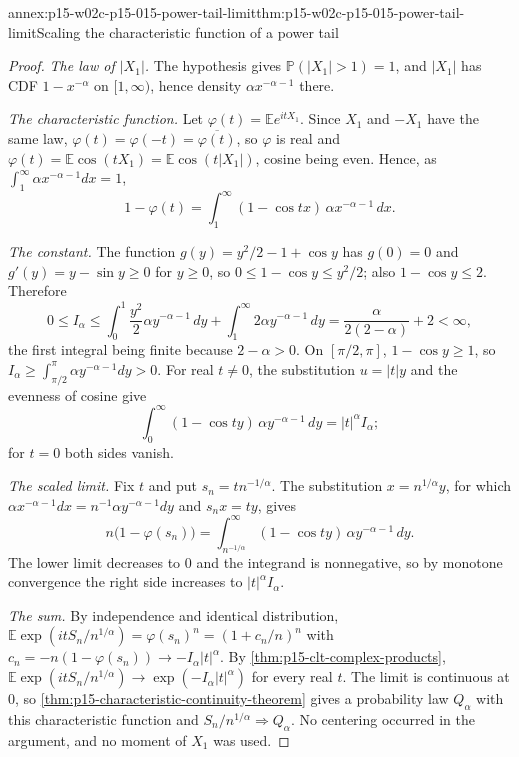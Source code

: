 \begin{annexitem}{annex:p15-w02c-p15-015-power-tail-limit}{thm:p15-w02c-p15-015-power-tail-limit}{Scaling the characteristic function of a power tail}
\begin{proof}
\emph{The law of \(|X_1|\).} The hypothesis gives
\(\mathbb P(|X_1|>1)=1\), and \(|X_1|\) has CDF \(1-x^{-\alpha}\) on
\([1,\infty)\), hence density \(\alpha x^{-\alpha-1}\) there.

\emph{The characteristic function.} Let
\(\varphi(t)=\mathbb Ee^{itX_1}\). Since \(X_1\) and \(-X_1\) have the
same law, \(\varphi(t)=\varphi(-t)=\overline{\varphi(t)}\), so
\(\varphi\) is real and \(\varphi(t)=\mathbb E\cos(tX_1)
=\mathbb E\cos(t|X_1|)\), cosine being even. Hence, as
\(\int_1^\infty\alpha x^{-\alpha-1}dx=1\),
\[
 1-\varphi(t)=\int_1^\infty(1-\cos tx)\,\alpha x^{-\alpha-1}\,dx .
\]

\emph{The constant.} The function \(g(y)=y^2/2-1+\cos y\) has
\(g(0)=0\) and \(g'(y)=y-\sin y\geq0\) for \(y\geq0\), so
\(0\leq1-\cos y\leq y^2/2\); also \(1-\cos y\leq2\). Therefore
\[
 0\leq I_\alpha\leq\int_0^1\frac{y^2}2\alpha y^{-\alpha-1}\,dy
   +\int_1^\infty2\alpha y^{-\alpha-1}\,dy
   =\frac{\alpha}{2(2-\alpha)}+2<\infty,
\]
the first integral being finite because \(2-\alpha>0\). On
\([\pi/2,\pi]\), \(1-\cos y\geq1\), so
\(I_\alpha\geq\int_{\pi/2}^\pi\alpha y^{-\alpha-1}dy>0\). For real
\(t\ne0\), the substitution \(u=|t|y\) and the evenness of cosine give
\[
 \int_0^\infty(1-\cos ty)\,\alpha y^{-\alpha-1}\,dy=|t|^\alpha I_\alpha ;
\]
for \(t=0\) both sides vanish.

\emph{The scaled limit.} Fix \(t\) and put \(s_n=tn^{-1/\alpha}\). The
substitution \(x=n^{1/\alpha}y\), for which
\(\alpha x^{-\alpha-1}dx=n^{-1}\alpha y^{-\alpha-1}dy\) and
\(s_nx=ty\), gives
\[
 n\bigl(1-\varphi(s_n)\bigr)
   =\int_{n^{-1/\alpha}}^\infty(1-\cos ty)\,\alpha y^{-\alpha-1}\,dy .
\]
The lower limit decreases to \(0\) and the integrand is nonnegative,
so by monotone convergence the right side increases to
\(|t|^\alpha I_\alpha\).

\emph{The sum.} By independence and identical distribution,
\(\mathbb E\exp(itS_n/n^{1/\alpha})=\varphi(s_n)^n=(1+c_n/n)^n\) with
\(c_n=-n(1-\varphi(s_n))\to-I_\alpha|t|^\alpha\). By
\cref{thm:p15-clt-complex-products},
\(\mathbb E\exp(itS_n/n^{1/\alpha})\to\exp(-I_\alpha|t|^\alpha)\) for
every real \(t\). The limit is continuous at \(0\), so
\cref{thm:p15-characteristic-continuity-theorem} gives a probability law
\(Q_\alpha\) with this characteristic function and
\(S_n/n^{1/\alpha}\Rightarrow Q_\alpha\). No centering occurred in the
argument, and no moment of \(X_1\) was used.


\end{proof}
\end{annexitem}
